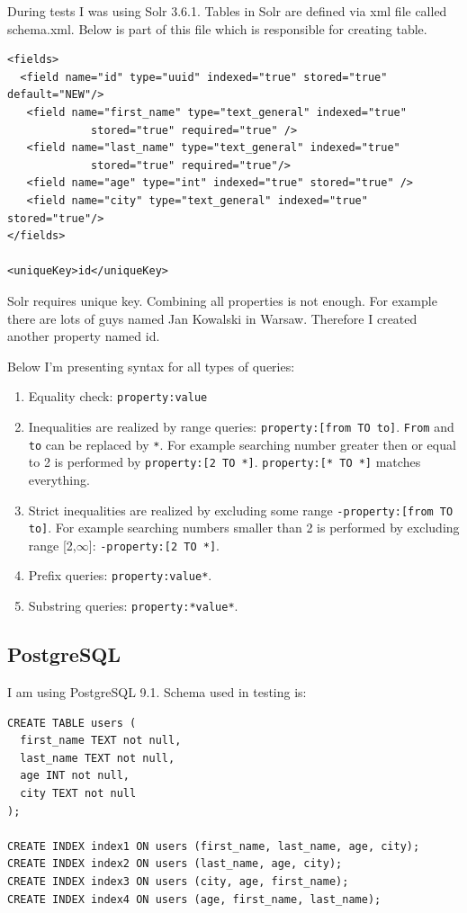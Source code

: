 \documentclass[10pt,a4paper]{article}
\begin{document}
During tests I was using Solr 3.6.1. Tables in Solr are defined via xml file called schema.xml. Below is part of this file which is responsible for creating table.

\begin{verbatim}
<fields>
  <field name="id" type="uuid" indexed="true" stored="true" default="NEW"/>
   <field name="first_name" type="text_general" indexed="true"
             stored="true" required="true" /> 
   <field name="last_name" type="text_general" indexed="true" 
             stored="true" required="true"/>
   <field name="age" type="int" indexed="true" stored="true" /> 
   <field name="city" type="text_general" indexed="true" stored="true"/>
</fields>

<uniqueKey>id</uniqueKey> 
\end{verbatim}

Solr requires unique key. Combining all properties is not enough. For example there are lots of guys named Jan Kowalski in Warsaw. Therefore I created another property named id.

\bigskip
Below I'm presenting syntax for all types of queries:
\begin{enumerate}
\item Equality check: \verb|property:value|
\item Inequalities are realized by range queries: \verb|property:[from TO to]|. \verb|From| and \verb|to| can be replaced by \verb|*|. For example searching number greater then or equal to 2 is performed by \verb|property:[2 TO *]|. \verb|property:[* TO *]| matches everything.
\item Strict inequalities are realized by excluding some range \verb|-property:[from TO to]|. For example searching numbers smaller than 2 is performed by excluding range [2,$\infty$]: \verb|-property:[2 TO *]|.
\item Prefix queries: \verb|property:value*|.
\item Substring queries: \verb|property:*value*|.
 
\end{enumerate}

\subsection{PostgreSQL}

I am using PostgreSQL 9.1. Schema used in testing is:

\begin{verbatim}
CREATE TABLE users (
  first_name TEXT not null,
  last_name TEXT not null,
  age INT not null,
  city TEXT not null
);

CREATE INDEX index1 ON users (first_name, last_name, age, city);
CREATE INDEX index2 ON users (last_name, age, city);
CREATE INDEX index3 ON users (city, age, first_name);
CREATE INDEX index4 ON users (age, first_name, last_name);
\end{verbatim}
\end{document}
